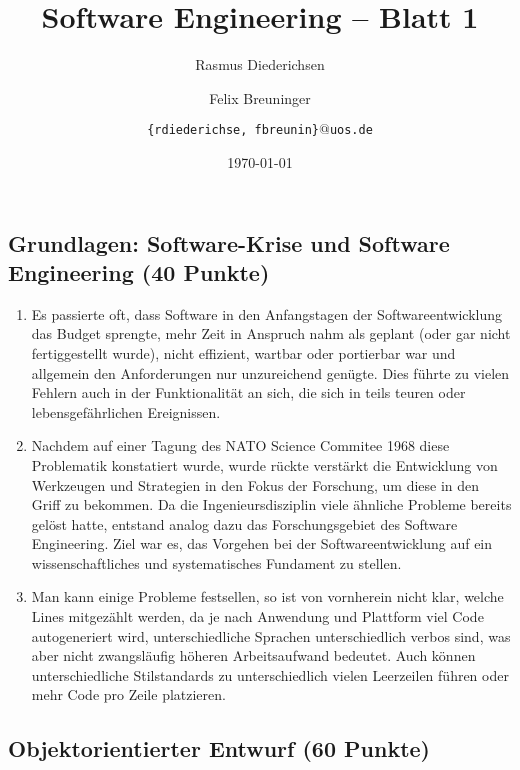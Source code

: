 \documentclass{scrartcl}
\title{\rmfamily Software Engineering -- Blatt 1}
\author{Rasmus Diederichsen \and Felix Breuninger\and %
   \texttt{\{rdiederichse, fbreunin\}$@$uos.de}
}
\date{\today}
\begin{document}
\selectfont
\maketitle


\setcounter{section}{1}
\setcounter{subsection}{1}
\subsection{Grundlagen: Software-Krise und Software Engineering (40 Punkte)}

\begin{enumerate}
   \item 
      Es passierte oft, dass Software in den Anfangstagen der
      Softwareentwicklung das Budget sprengte, mehr Zeit in Anspruch nahm als
      geplant (oder gar nicht fertiggestellt wurde), nicht effizient, wartbar
      oder portierbar war und allgemein den Anforderungen nur unzureichend
      genügte. Dies führte zu vielen Fehlern auch in der Funktionalität an sich,
      die sich in teils teuren oder lebensgefährlichen Ereignissen.
   \item Nachdem auf einer Tagung des NATO Science Commitee 1968 diese
      Problematik konstatiert wurde, wurde rückte verstärkt die Entwicklung von
      Werkzeugen und Strategien in den Fokus der Forschung, um diese in den
      Griff zu bekommen. Da die Ingenieursdisziplin viele ähnliche Probleme
      bereits gelöst hatte, entstand analog dazu das Forschungsgebiet des
      Software Engineering. Ziel war es, das Vorgehen bei der
      Softwareentwicklung auf ein wissenschaftliches und systematisches
      Fundament zu stellen.
   \item Man kann einige Probleme festsellen, so ist von vornherein nicht klar,
      welche Lines mitgezählt werden, da je nach Anwendung und Plattform viel Code
      autogeneriert wird, unterschiedliche Sprachen unterschiedlich verbos sind,
      was aber nicht zwangsläufig höheren Arbeitsaufwand bedeutet. Auch können
      unterschiedliche Stilstandards zu unterschiedlich vielen Leerzeilen führen
      oder mehr Code pro Zeile platzieren.
\end{enumerate}


\subsection{Objektorientierter Entwurf (60 Punkte)}
\end{document}
